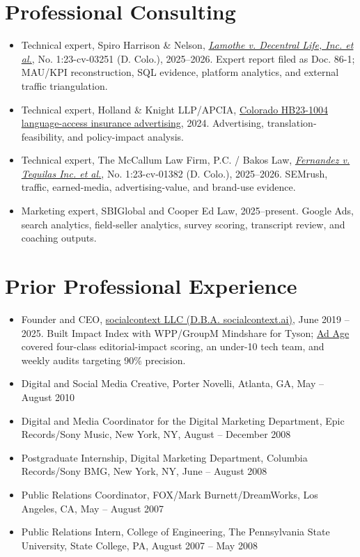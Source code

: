 \documentclass[11pt,letterpaper]{article}
\begin{document}
\section{Professional Consulting}
\begin{itemize}
\item Technical expert, Spiro Harrison \& Nelson, \href{https://www.pacermonitor.com/public/case/51642743/Lamothe_v_Decentral_Life,_Inc_et_al}{\textit{Lamothe v. Decentral Life, Inc. et al.}}, No. 1:23-cv-03251 (D. Colo.), 2025--2026. Expert report filed as Doc. 86-1; MAU/KPI reconstruction, SQL evidence, platform analytics, and external traffic triangulation.
\item Technical expert, Holland \& Knight LLP/APCIA, \href{https://leg.colorado.gov/bills/hb23-1004}{Colorado HB23-1004 language-access insurance advertising}, 2024. Advertising, translation-feasibility, and policy-impact analysis.
\item Technical expert, The McCallum Law Firm, P.C. / Bakos Law, \href{https://www.pacermonitor.com/public/case/49071033/Fernandez_v_Tequilas_Inc_et_al}{\textit{Fernandez v. Tequilas Inc. et al.}}, No. 1:23-cv-01382 (D. Colo.), 2025--2026. SEMrush, traffic, earned-media, advertising-value, and brand-use evidence.
\item Marketing expert, SBIGlobal and Cooper Ed Law, 2025--present. Google Ads, search analytics, field-seller analytics, survey scoring, transcript review, and coaching outputs.
\end{itemize}
\section{Prior Professional Experience}
\begin{itemize}
\item Founder and CEO, \href{https://socialcontext.ai/our-team/}{socialcontext LLC (D.B.A. socialcontext.ai)}, June 2019 -- 2025. Built Impact Index with WPP/GroupM Mindshare for Tyson; \href{https://web.archive.org/web/20220810102411/https://adage.com/article/agency-news/mindshare-ai-tool-measures-whether-editorial-content-toxic/2425856}{Ad Age} covered four-class editorial-impact scoring, an under-10 tech team, and weekly audits targeting 90\% precision.
\item Digital and Social Media Creative, Porter Novelli, Atlanta, GA, May -- August 2010
\item Digital and Media Coordinator for the Digital Marketing Department, Epic Records/Sony Music, New York, NY, August -- December 2008
\item Postgraduate Internship, Digital Marketing Department, Columbia Records/Sony BMG, New York, NY, June -- August 2008
\item Public Relations Coordinator, FOX/Mark Burnett/DreamWorks, Los Angeles, CA, May -- August 2007
\item Public Relations Intern, College of Engineering, The Pennsylvania State University, State College, PA, August 2007 -- May 2008
\end{itemize}
\end{document}
